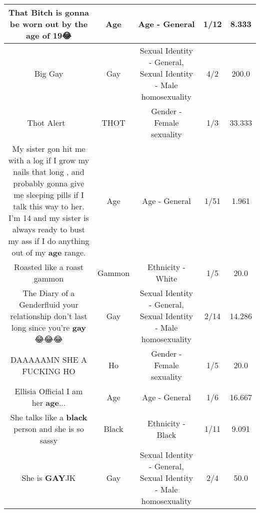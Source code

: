 \documentclass[11pt]{article}
\newlength\mylength
\begin{document}
\begin{center}
\begin{longtable}{|C{.65\mylength}|C{.30\mylength}|C{.12\mylength}|C{.12\mylength}|C{.12\mylength}|}
  \small That Bitch is gonna be worn out by the \textbf{age} of 19😂\normalsize   & Age & Age - General & 1/12 & 8.333 \\  \hline
  \small Big Gay\normalsize   & Gay & Sexual Identity - General, Sexual Identity - Male homosexuality & 4/2 & 200.0 \\  \hline
  \small Thot Alert 🚨\normalsize   & THOT & Gender - Female sexuality & 1/3 & 33.333 \\  \hline
  \small My sister gon hit me with a log if I grow my nails that long , and probably gonna give me sleeping pills if I talk this way to her. I'm 14 and my sister is always ready to bust my ass if I do anything out of my \textbf{age} range.\normalsize   & Age & Age - General & 1/51 & 1.961 \\  \hline
  \small Roasted  like a roast gammon\normalsize   & Gammon & Ethnicity - White & 1/5 & 20.0 \\  \hline
  \small The Diary of a Genderfluid your relationship don't last long since you're \textbf{g\textbf{ay}} 😂😂😂\normalsize   & Gay & Sexual Identity - General, Sexual Identity - Male homosexuality & 2/14 & 14.286 \\  \hline
  \small DAAAAAMN SHE A FUCKING HO\normalsize   & Ho & Gender - Female sexuality & 1/5 & 20.0 \\  \hline
  \small Ellisia Official I am her \textbf{age}...\normalsize   & Age & Age - General & 1/6 & 16.667 \\  \hline
  \small She talks like a \textbf{black} person and she is so sassy\normalsize   & Black & Ethnicity - Black & 1/11 & 9.091 \\  \hline
  \small She is \textbf{G\textbf{AY}}JK\normalsize   & Gay & Sexual Identity - General, Sexual Identity - Male homosexuality & 2/4 & 50.0 \\  \hline

\end{longtable}
\end{center}
\end{document}
